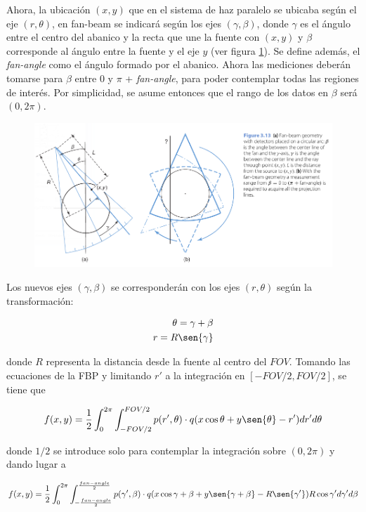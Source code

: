 Ahora, la ubicación $(x,y)$ que en el sistema de haz paralelo se ubicaba según el eje $(r,\theta)$, en fan-beam se indicará según los ejes $(\gamma, \beta)$, donde $\gamma$ es el ángulo entre el centro del abanico y la recta que une la fuente con $(x,y)$ y $\beta$ corresponde al ángulo entre la fuente y el eje $y$ (ver figura \ref{fig:10-2}). Se define además, el \emph{fan-angle} como el ángulo formado por el abanico. Ahora las mediciones deberán tomarse para $\beta$ entre 0 y $\pi$ + \emph{fan-angle}, para poder contemplar todas las regiones de interés. Por simplicidad, se asume entonces que el rango de los datos en $\beta$ será $(0, 2\pi)$.

\begin{figure}
 \centering
 \includegraphics[width=.75\textwidth]{figures/cap10-2.png}
 \caption{}
 \label{fig:10-2}
\end{figure}

Los nuevos ejes $(\gamma, \beta)$ se corresponderán con los ejes $(r, \theta)$ según la transformación:

\begin{eqnarray}
 \theta = \gamma + \beta \\
 r = R \sen{\gamma}
\end{eqnarray}

\noindent
donde $R$ representa la distancia desde la fuente al centro del $FOV$. Tomando las ecuaciones de la FBP y limitando $r'$ a la integración en $[-FOV/2, FOV/2]$, se tiene que

\begin{equation}
 f(x,y) = \frac{1}{2}\int_{0}^{2\pi}{\int_{-FOV/2}^{FOV/2}{p(r',\theta)\cdot q(x \cos{\theta} + y \sen{\theta} - r')dr'}d\theta}
\end{equation}

\noindent
donde $1/2$ se introduce solo para contemplar la integración sobre $(0, 2\pi)$ y dando lugar a

\begin{equation}
 f(x,y) = \frac{1}{2} \int_{0}^{2\pi}{\int_{-\frac{fan-angle}{2}}^{\frac{fan-angle}{2}}{p(\gamma',\beta)\cdot q(x \cos{\gamma + \beta} + y \sen{\gamma + \beta} - R\sen{\gamma'})R \cos{\gamma'}d\gamma'}d\beta}
\end{equation}

